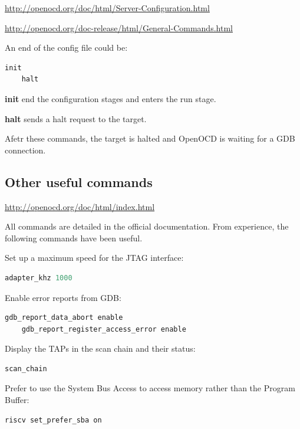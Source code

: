 \documentclass{article}
\begin{document}
    \url{http://openocd.org/doc/html/Server-Configuration.html}
    
    \url{http://openocd.org/doc-release/html/General-Commands.html}
    
    An end of the config file could be:
    
    \begin{lstlisting}[language=tcl]
    init
    halt
    \end{lstlisting}
    
    \textbf{init} end the configuration stages and enters the run stage.
    
    \textbf{halt} sends a halt request to the target.
    
    Afetr these commands, the target is halted and OpenOCD is waiting for a GDB connection.
    
    \subsection{Other useful commands}
    
    \url{http://openocd.org/doc/html/index.html}
    
    All commands are detailed in the official documentation. From experience, the following commands have been useful.
    
    Set up a maximum speed for the JTAG interface:
    
    \begin{lstlisting}[language=tcl]
    adapter_khz 1000
    \end{lstlisting}
    
    Enable error reports from GDB:
    
    \begin{lstlisting}[language=tcl]
    gdb_report_data_abort enable
    gdb_report_register_access_error enable
    \end{lstlisting}
    
    Display the TAPs in the scan chain and their status:
    
    \begin{lstlisting}[language=tcl]
    scan_chain
    \end{lstlisting}
    
    Prefer to use the System Bus Access to access memory rather than the Program Buffer:
    
    \begin{lstlisting}[language=tcl]
    riscv set_prefer_sba on
    \end{lstlisting}
    
\end{document}
